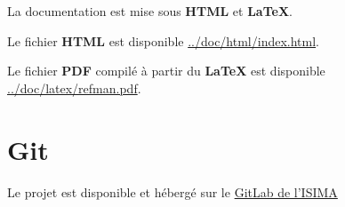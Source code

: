 \documentclass[11pt]{article}
\begin{document}
La documentation est mise sous \textbf{HTML} et \textbf{\LaTeX{}}.

Le fichier \textbf{HTML} est disponible \href{/home/hozen/cur/projet-java/doc/html/index.html}{../doc/html/index.html}.

Le fichier \textbf{PDF} compilé à partir du \textbf{\LaTeX{}} est disponible
\href{/home/hozen/cur/projet-java/doc/latex/refman.pdf}{../doc/latex/refman.pdf}.

\section{Git\label{orgacd542c}}
\label{sec:orgce425cf}

Le projet est disponible et hébergé sur le \href{https://gitlab.isima.fr}{GitLab de l'ISIMA}

\newpage
\listoffigures
\end{document}
